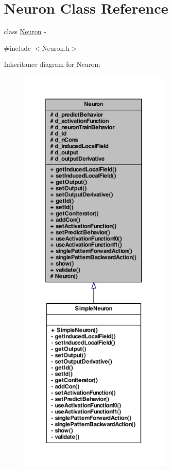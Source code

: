 \hypertarget{class_neuron}{
\section{Neuron Class Reference}
\label{class_neuron}
}


class \hyperlink{class_neuron}{Neuron} -\/  




{\ttfamily \#include $<$Neuron.h$>$}



Inheritance diagram for Neuron:\nopagebreak
\begin{figure}[H]
\begin{center}
\leavevmode
\includegraphics[height=600pt]{class_neuron__inherit__graph}
\end{center}
\end{figure}

